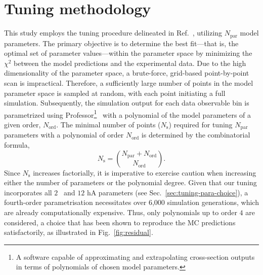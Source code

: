 \section{\label{sec:Tuning-method}Tuning methodology}
This study employs the tuning procedure delineated in Ref.~\cite{GENIE:2022qrc}, utilizing $N_{\textrm{par}}$ model parameters. 
The primary objective is to determine the best fit—that is, the optimal set of parameter values—within the parameter space by minimizing the $\chi^2$ between the model predictions and the experimental data. 
Due to the high dimensionality of the parameter space, a brute-force, grid-based point-by-point scan is impractical. 
Therefore, a sufficiently large number of points in the model parameter space is sampled at random, with each point initiating a full simulation. 
Subsequently, the simulation output for each data observable bin is parametrized using Professor\footnote{A software capable of approximating and extrapolating cross-section outputs in terms of polynomials of chosen model parameters.}~\cite{Buckley:2009bj} with a polynomial of the model parameters of a given order, $N_{\textrm{ord}}$.
The minimal number of points ($N_{\textrm{s}}$) required for tuning $N_{\textrm{par}}$ parameters with a polynomial of order $N_{\textrm{ord}}$ is determined by the combinatorial formula,
\begin{equation}
    N_{\textrm{s}} = \binom{N_{\textrm{par}}+N_{\textrm{ord}}}{N_{\textrm{ord}}}.
\end{equation}
Since $N_\textrm{s}$ increases factorially, it is imperative to exercise caution when increasing either the number of parameters or the polynomial degree. 
Given that our tuning incorporates all $2$ \sfcfg\ and $12$ hA parameters (see Sec.~\ref{sec:tuning-para-choice}), a fourth-order parametrisation necessitates over 6,000 simulation generations, which are already computationally expensive.
Thus, only polynomials up to order $4$ are considered, a choice that has been shown to reproduce the MC predictions satisfactorily, as illustrated in Fig.~\ref{fig:residual}. 
